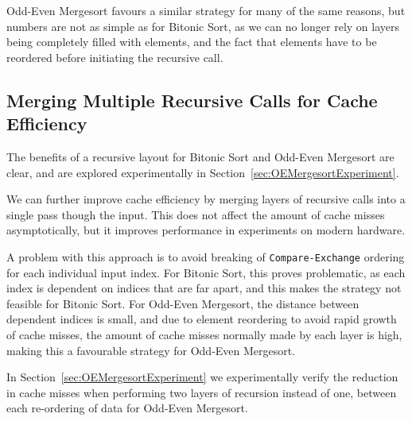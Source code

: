 Odd-Even Mergesort favours a similar strategy for many of the same reasons, but numbers are not as simple as for Bitonic Sort, as we can no longer rely on layers being completely filled with elements, and the fact that elements have to be reordered before initiating the recursive call.

\subsection{Merging Multiple Recursive Calls for Cache Efficiency}

The benefits of a recursive layout for Bitonic Sort and Odd-Even Mergesort are clear, and are explored experimentally in Section~\ref{sec:OEMergesortExperiment}. 

We can further improve cache efficiency by merging layers of recursive calls into a single pass though the input. This does not affect the amount of cache misses asymptotically, but it improves performance in experiments on modern hardware.

A problem with this approach is to avoid breaking of \texttt{Compare-Exchange} ordering for each individual input index. For Bitonic Sort, this proves problematic, as each index is dependent on indices that are far apart, and this makes the strategy not feasible for Bitonic Sort. For Odd-Even Mergesort, the distance between dependent indices is small, and due to element reordering to avoid rapid growth of cache misses, the amount of cache misses normally made by each layer is high, making this a favourable strategy for Odd-Even Mergesort.

In Section~\ref{sec:OEMergesortExperiment} we experimentally verify the reduction in cache misses when performing two layers of recursion instead of one, between each re-ordering of data for Odd-Even Mergesort.